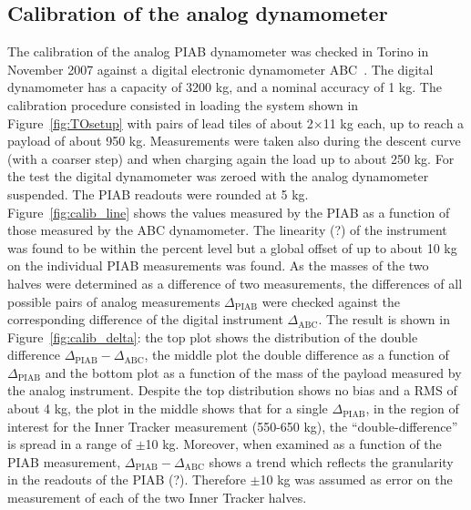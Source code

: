 \documentclass{cmspaper}
\begin{document}
\subsection{Calibration of the analog dynamometer}
The calibration of the analog PIAB dynamometer was checked in Torino in November
2007 against a digital electronic dynamometer ABC~\cite{abc}.
The digital dynamometer has a capacity of 3200 kg, and a nominal
accuracy of 1 kg. The calibration procedure consisted in loading the
system shown in Figure~\ref{fig:TOsetup} with pairs of lead tiles of
about 2$\times$11 kg each, up to reach a payload of about 950
kg. Measurements were taken also during the descent curve (with a
coarser step) and when charging again the load up to about 250 kg.
For the test the digital dynamometer was zeroed with the analog
dynamometer suspended. The PIAB readouts were rounded at 5 kg.\\
Figure~\ref{fig:calib_line} shows the
values measured by the PIAB as a function of those measured by the ABC
dynamometer. The linearity (?) of the instrument was found to be within the percent
level but a global offset of up to about 10 kg on the individual PIAB
measurements was found. As the masses of the two halves were determined as a
difference of two measurements, the differences of all possible pairs of
analog measurements $\Delta_{\mathrm{PIAB}}$  were checked against the
corresponding difference of the digital instrument $\Delta_{\mathrm{ABC}}$.
The result is shown in Figure~\ref{fig:calib_delta}: the top plot
shows the distribution of the double difference
$\Delta_{\mathrm{PIAB}}-\Delta_{\mathrm{ABC}}$, the middle plot the
double difference as a function of $\Delta_{\mathrm{PIAB}}$ and the
bottom plot as a function of the mass of the payload measured by the
analog instrument. Despite the top distribution shows no bias and a
RMS of about 4 kg, the plot in the middle shows that for a single  
$\Delta_{\mathrm{PIAB}}$, in the region of interest for the Inner Tracker
measurement (550-650 kg), the ``double-difference'' is spread in a range
of $\pm$10 kg. Moreover, when examined as a function of the PIAB
measurement, $\Delta_{\mathrm{PIAB}}-\Delta_{\mathrm{ABC}}$ shows a
trend which reflects the granularity in the readouts of the PIAB (?).
Therefore $\pm$10 kg was assumed as error on the measurement of each
of the two Inner Tracker halves.
\end{document}
